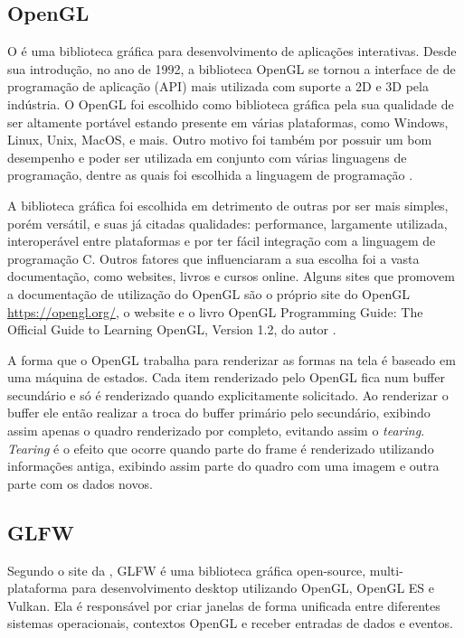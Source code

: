 \documentclass[12pt, %
openright,
oneside, %
a4paper,    %
brazil]{facom-ufu-abntex2}
\begin{document}
\subsection{OpenGL}
O  é uma biblioteca gráfica para desenvolvimento de aplicações interativas. Desde sua introdução, no ano de 1992, a biblioteca OpenGL se tornou  a interface de de programação de aplicação (API) mais utilizada com suporte a 2D e 3D pela indústria. O OpenGL foi escolhido como biblioteca gráfica pela sua qualidade de ser altamente portável estando presente em várias plataformas, como Windows, Linux, Unix, MacOS, e mais. Outro motivo foi também por possuir um bom desempenho e poder ser utilizada em conjunto com várias linguagens de programação, dentre as quais foi escolhida a linguagem de programação .

A biblioteca gráfica  foi escolhida em detrimento de outras por ser mais simples, porém versátil, e suas já citadas qualidades: performance, largamente utilizada, interoperável entre plataformas e por ter fácil integração com a linguagem de programação C. Outros fatores que influenciaram a sua escolha foi a vasta documentação, como websites, livros e cursos online. Alguns sites que promovem a documentação de utilização do OpenGL são o próprio site do OpenGL \hyperref[https://opengl.org/]{https://opengl.org/}, o website  e o livro OpenGL Programming Guide: The Official Guide to Learning OpenGL, Version 1.2, do autor .

A forma que o OpenGL trabalha para renderizar as formas na tela é baseado em uma máquina de estados. Cada item renderizado pelo OpenGL fica num buffer secundário e só é renderizado quando explicitamente solicitado. Ao renderizar o buffer ele então realizar a troca do buffer primário pelo secundário, exibindo assim apenas o quadro renderizado por completo, evitando assim o \textit{tearing}. \textit{Tearing} é o efeito que ocorre quando parte do frame é renderizado utilizando informações antiga, exibindo assim parte do quadro com uma imagem e outra parte com os dados novos.

\subsection{GLFW}
Segundo o site da , GLFW é uma biblioteca gráfica open-source, multi-plataforma para desenvolvimento desktop utilizando OpenGL, OpenGL ES e Vulkan. Ela é responsável por criar janelas de forma unificada entre diferentes sistemas operacionais, contextos OpenGL e receber entradas de dados e eventos.
\end{document}
